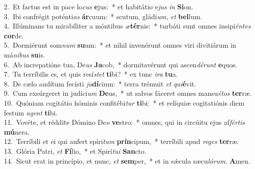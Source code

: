 {2.~}Et factus est in pace lo\textit{cus} \textbf{e}jus:~* et habitátio e\textit{jus} \textit{in} \textbf{Si}on.\\
{3.~}Ibi confrégit poténti\textit{as} \textbf{ár}cuum:~* scutum, gládi\textit{um}, \textit{et} \textbf{bel}lum.\\
{4.~}Illúminans tu mirabíliter a móntibus \textit{æ}\textbf{tér}nis:~* turbáti sunt omnes insipi\textit{én}\textit{tes} \textbf{cor}de.\\
{5.~}Dormiérunt som\textit{num} \textbf{su}um:~* et nihil invenérunt omnes viri divitiárum in má\textit{ni}\textit{bus} \textbf{su}is.\\
{6.~}Ab increpatióne tua, De\textit{us} \textbf{Ja}cob,~* dormitavérunt qui ascen\textit{dé}\textit{runt} \textbf{e}quos.\\
{7.~}Tu terríbilis es, et quis resí\textit{stet} \textbf{ti}bi?~* ex tunc \textit{i}\textit{ra} \textbf{tu}a.\\
{8.~}De cælo audítum fecísti \textit{ju}\textbf{dí}cium:~* terra trémuit \textit{et} \textit{qui}\textbf{é}vit.\\
{9.~}Cum exsúrgeret in judíci\textit{um} \textbf{De}us,~* ut salvos fáceret omnes mansu\textit{é}\textit{tos} \textbf{ter}ræ.\\
{10.~}Quóniam cogitátio hóminis confitébi\textit{tur} \textbf{ti}bi:~* et relíquiæ cogitatiónis diem festum \textit{a}\textit{gent} \textbf{ti}bi.\\
{11.~}Vovéte, et réddite Dómino De\textit{o} \textbf{ve}stro:~* omnes, qui in circúitu ejus af\textit{fér}\textit{tis} \textbf{mú}nera.\\
{12.~}Terríbili et ei qui aufert spíri\textit{tum} \textbf{prín}cipum,~* terríbili apud \textit{re}\textit{ges} \textbf{ter}ræ.\\
{13.~}Glória Patri, \textit{et} \textbf{Fí}lio,~* et Spirí\textit{tu}\textit{i} \textbf{San}cto.\\
{14.~}Sicut erat in princípio, et nunc, \textit{et} \textbf{sem}per,~* et in sǽcula sæcu\textit{ló}\textit{rum}. \textbf{A}men.\\
